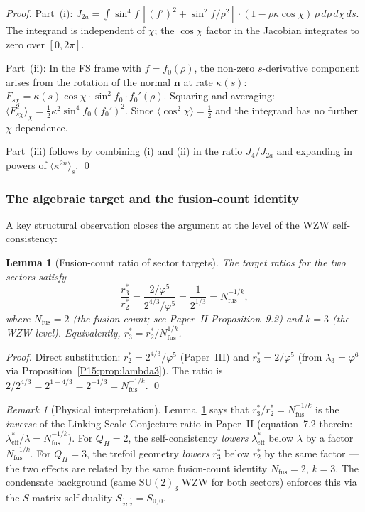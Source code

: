 \documentclass[11pt,a4paper]{article}
\newtheorem{lemma}[theorem]{Lemma}
\theoremstyle{definition}\newtheorem{definition}[theorem]{Definition}
\theoremstyle{remark}
\newtheorem{remark}[theorem]{Remark}
\newcommand{\vp}{\varphi}
\newcommand{\lam}{\lambda}
\newcommand{\QH}{Q_H}
\begin{document}
\begin{proof}
Part~(i): $J_{2a} = \int \sin^4\!f\,[{(f')}^2+\sin^2\!f/\rho^2]\cdot
(1-\rho\kappa\cos\chi)\,\rho\,d\rho\,d\chi\,ds$.
The integrand is independent of $\chi$; the $\cos\chi$ factor in the
Jacobian integrates to zero over $[0,2\pi]$.

Part~(ii): In the FS frame with $f=f_0(\rho)$, the non-zero
$s$-derivative component arises from the rotation of the normal
$\mathbf{n}$ at rate $\kappa(s)$:
$F_{s\chi} = \kappa(s)\cos\chi \cdot \sin^2\!f_0 \cdot f_0'(\rho)$.
Squaring and averaging: $\langle F_{s\chi}^2\rangle_\chi = \tfrac12\kappa^2\sin^4\!f_0(f_0')^2$.
Since $\langle\cos^2\chi\rangle=\tfrac12$ and the integrand has no
further $\chi$-dependence.

Part~(iii) follows by combining (i) and (ii) in the ratio $J_4/J_{2a}$
and expanding in powers of $\langle\kappa^{2n}\rangle_s$.
\qed
\end{proof}

\subsubsection*{The algebraic target and the fusion-count identity}

A key structural observation closes the argument at the level of
the WZW self-consistency:

\begin{lemma}[Fusion-count ratio of sector targets]
\label{P15:lem:fusion_ratio}
The target ratios for the two sectors satisfy
\begin{equation}
  \frac{r_3^*}{r_2^*}
  = \frac{2/\vp^5}{2^{4/3}/\vp^5}
  = \frac{1}{2^{1/3}}
  = N_{\mathrm{fus}}^{-1/k},
  \label{P15:eq:fusion_ratio}
\end{equation}
where $N_{\mathrm{fus}}=2$ (the fusion count; see Paper~II Proposition~9.2)
and $k=3$ (the WZW level).
Equivalently, $r_3^* = r_2^*/N_{\mathrm{fus}}^{1/k}$.
\end{lemma}

\begin{proof}
Direct substitution: $r_2^* = 2^{4/3}/\vp^5$ (Paper~III) and
$r_3^* = 2/\vp^5$ (from $\lam_3=\vp^6$ via Proposition~\ref{P15:prop:lambda3}).
The ratio is $2/2^{4/3} = 2^{1-4/3} = 2^{-1/3} = N_{\mathrm{fus}}^{-1/k}$.
\qed
\end{proof}

\begin{remark}[Physical interpretation]
\label{P15:rem:fusion_ratio_interp}
Lemma~\ref{P15:lem:fusion_ratio} says that $r_3^*/r_2^* = N_\mathrm{fus}^{-1/k}$ is the
\emph{inverse} of the Linking Scale Conjecture ratio in Paper~II
(equation~7.2 therein: $\lambda_{\mathrm{eff}}^*/\lambda = N_{\mathrm{fus}}^{-1/k}$).
For $\QH=2$, the self-consistency \emph{lowers} $\lambda_{\mathrm{eff}}^*$ below $\lambda$
by a factor $N_{\mathrm{fus}}^{-1/k}$.
For $\QH=3$, the trefoil geometry \emph{lowers} $r_3^*$ below $r_2^*$
by the same factor --- the two effects are related by the same
fusion-count identity $N_{\mathrm{fus}}=2$, $k=3$.
The condensate background (same $\mathrm{SU}(2)_3$ WZW for both sectors)
enforces this via the $S$-matrix self-duality $S_{\frac12,\frac12}=S_{0,0}$.
\end{remark}
\end{document}
